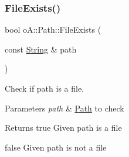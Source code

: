 \subsubsection{\texorpdfstring{File\+Exists()}{FileExists()}}
{\footnotesize\ttfamily bool o\+A\+::\+Path\+::\+File\+Exists (\begin{DoxyParamCaption}\item[{const \mbox{\hyperlink{classo_a_1_1_string}{String}} \&}]{path }\end{DoxyParamCaption})}



Check if path is a file. 


\begin{DoxyParams}{Parameters}
{\em path} & \mbox{\hyperlink{namespaceo_a_1_1_path}{Path}} to check \\
\hline
\end{DoxyParams}
\begin{DoxyReturn}{Returns}
true Given path is a file 

false Given path is not a file 
\end{DoxyReturn}
